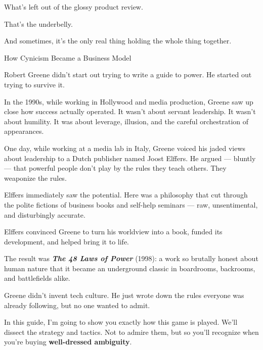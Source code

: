   What’s left out of the glossy product review.
  
  That’s the underbelly.  

  And sometimes, it’s the only real thing holding the whole thing together.
 
\medskip

\begin{HistoricalSidebar}{How Cynicism Became a Business Model}

  Robert Greene didn’t start out trying to write a guide to power.  He started out trying to survive it.

  \medskip
  
  In the 1990s, while working in Hollywood and media production, Greene saw up close how success actually operated.  It wasn’t about servant leadership. It wasn’t about humility.  It was about leverage, illusion, and the careful orchestration of appearances.

  \medskip
  
  One day, while working at a media lab in Italy, Greene voiced his jaded views about leadership to a Dutch publisher named Joost Elffers.  He argued — bluntly — that powerful people don't play by the rules they teach others.  They weaponize the rules.

  \medskip
  
  Elffers immediately saw the potential.  Here was a philosophy that cut through the polite fictions of business books and self-help seminars — raw, unsentimental, and disturbingly accurate.

  \medskip
  
  Elffers convinced Greene to turn his worldview into a book, funded its development, and helped bring it to life.

  \medskip
  
  The result was \textbf{\textit{The 48 Laws of Power}} (1998): a work so brutally honest about human nature that it became an underground classic in boardrooms, backrooms, and battlefields alike.

  \medskip
  
  Greene didn’t invent tech culture.  He just wrote down the rules everyone was already following, but no one wanted to admit.
  
\end{HistoricalSidebar}

\medskip

In this guide, I’m going to show you exactly how this game is played. We’ll dissect the strategy and tactics.
Not to admire them, but so you’ll recognize when you're buying 
\textbf{well-dressed ambiguity}.

